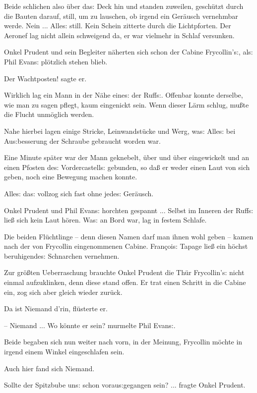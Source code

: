 \documentclass[oneside,12pt]{book}
\newcommand{\s}{s:}
\begin{document}
Beide schlichen also \"uber da{\s} Deck hin und standen zuweilen,
gesch\"utzt durch die Bauten darauf, still, um zu lauschen, ob irgend
ein Ger\"ausch vernehmbar werde. Nein ... Alle{\s} still. Kein Schein
zitterte durch die Lichtpforten. Der Aeronef lag nicht allein
schweigend da, er war vielmehr in Schlaf versunken.

Onkel Prudent und sein Begleiter n\"aherten sich schon der Cabine
Frycollin'{\s}, al{\s} Phil Evan{\s} pl\"otzlich stehen blieb.

{\glqq}Der Wachtposten!{\grqq} sagte er.

Wirklich lag ein Mann in der N\"ahe eine{\s} der Ruff{\s}. Offenbar
konnte derselbe, wie man zu sagen pflegt, kaum eingenickt sein. Wenn
dieser L\"arm schlug, mu{\ss}te die Flucht unm\"oglich werden.

Nahe hierbei lagen einige Stricke, Leinwandst\"ucke und Werg, wa{\s}
Alle{\s} bei Au{\s}besserung der Schraube gebraucht worden war.

Eine Minute sp\"ater war der Mann geknebelt, \"uber und \"uber
eingewickelt und an einen Pfosten de{\s} Vordercastell{\s} gebunden,
so da{\ss} er weder einen Laut von sich geben, noch eine Bewegung
machen konnte.

Alle{\s} da{\s} vollzog sich fast ohne jede{\s} Ger\"ausch.

Onkel Prudent und Phil Evan{\s} horchten gespannt ... Selbst im
Inneren der Ruff{\s} lie{\ss} sich kein Laut h\"oren. Wa{\s} an Bord
war, lag in festem Schlafe.

Die beiden Fl\"uchtlinge -- denn diesen Namen darf man ihnen wohl
geben -- kamen nach der von Frycollin eingenommenen Cabine.
Fran\c{c}oi{\s} Tapage lie{\ss} ein h\"ochst beruhigende{\s}
Schnarchen vernehmen.

Zur gr\"o{\ss}ten Ueberraschung brauchte Onkel Prudent die Th\"ur
Frycollin'{\s} nicht einmal aufzuklinken, denn diese stand offen. Er
trat einen Schritt in die Cabine ein, zog sich aber gleich wieder
zur\"uck.

{\glqq}Da ist Niemand d'rin, fl\"usterte er.

-- Niemand ... Wo k\"onnte er sein?{\grqq} murmelte Phil Evan{\s}.

Beide begaben sich nun weiter nach vorn, in der Meinung, Frycollin
m\"ochte in irgend einem Winkel eingeschlafen sein.

Auch hier fand sich Niemand.

{\glqq}Sollte der Spitzbube un{\s} schon vorau{\s}gegangen sein? ...
fragte Onkel Prudent.
\end{document}
